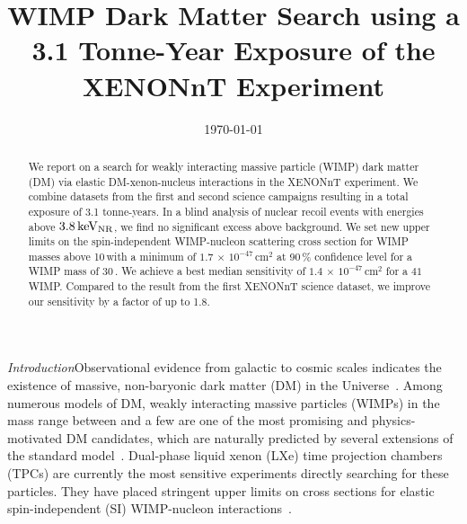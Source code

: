\documentclass[
    reprint,
    superscriptaddress,
    aps, prl,
    amsmath,amssymb,
    twocolumn,
    showkeys,
    floatfix,
    nofootinbib,
]{revtex4-2}
\begin{document}


\title{WIMP Dark Matter Search using a 3.1 Tonne-Year Exposure of the XENONnT Experiment}



\date{\today}

\begin{abstract}
We report on a search for weakly interacting massive particle (WIMP) dark matter (DM) via elastic DM-xenon-nucleus interactions in the XENONnT experiment.
We combine datasets from the first and second science campaigns resulting in a total exposure of 3.1 tonne-years.
In a blind analysis of nuclear recoil events with energies above $3.8\,\mathrm{keV_{NR}}$, we find no significant excess above background.
We set new upper limits on the spin-independent WIMP-nucleon scattering cross section for WIMP masses above 10\,\gevcc with a minimum of $1.7\,\times\,10^{-47}\,\mathrm{cm^2}$  at 90\,\% confidence level for a WIMP mass of $30$\,\gevcc.
We achieve a best median sensitivity of $1.4\,\times\,10^{-47}\,\mathrm{cm^2}$ for a $41$\,\gevcc WIMP.
Compared to the result from the first XENONnT science dataset, we improve our sensitivity by a factor of up to 1.8.
\end{abstract}
\maketitle

\textit{Introduction\textemdash}Observational evidence from galactic to cosmic scales indicates the existence of massive, non-baryonic dark matter (DM) in the Universe~\cite{Bertone:2004pz}.
Among numerous models of DM, weakly interacting massive particles (WIMPs) in the mass range between \gevcc and a few \tevcc are one of the most promising and physics-motivated DM candidates, which are naturally predicted by several extensions of the standard model~\cite{Roszkowski:2017nbc}.
Dual-phase liquid xenon (LXe) time projection chambers (TPCs) are currently the most sensitive experiments directly searching for these particles.
They have placed stringent upper limits on cross sections for elastic spin-independent (SI)  WIMP-nucleon interactions~\cite{XENON:2023wimp, LZ:2025_wimp, PandaX:2025_wimp_search}.
\end{document}
